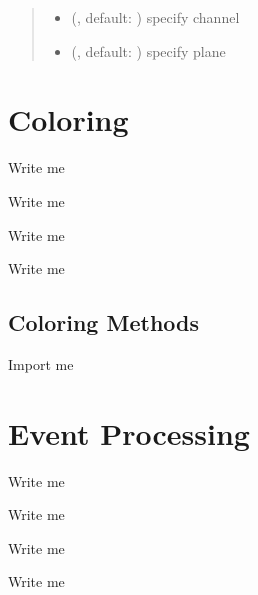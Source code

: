 \documentclass[letterpaper,10pt,english]{sphinxmanual}
\begin{document}
\begin{fulllineitems}
\begin{quote}
\begin{description}
\begin{itemize}
\item {} 
\sphinxAtStartPar
{} (, default: ) \textendash{} specify channel

\item {} 
\sphinxAtStartPar
{} (, default: ) \textendash{} specify plane

\end{itemize}

\sphinxAtStartPar
{}

\end{description}\end{quote}

\end{fulllineitems}



\section{Coloring}
\label{\detokenize{Sub-Packages:coloring}}\label{\detokenize{Sub-Packages:coloring-module}}
\begin{DUlineblock}{0em}
\item[] Write me
\item[] Write me
\item[] Write me
\item[] Write me
\end{DUlineblock}


\subsection{Coloring Methods}
\label{\detokenize{Sub-Packages:coloring-methods}}
\begin{DUlineblock}{0em}
\item[] Import me
\end{DUlineblock}


\section{Event Processing}
\label{\detokenize{Sub-Packages:event-processing}}\label{\detokenize{Sub-Packages:event-processing-module}}
\begin{DUlineblock}{0em}
\item[] Write me
\item[] Write me
\item[] Write me
\item[] Write me
\end{DUlineblock}
\end{document}
